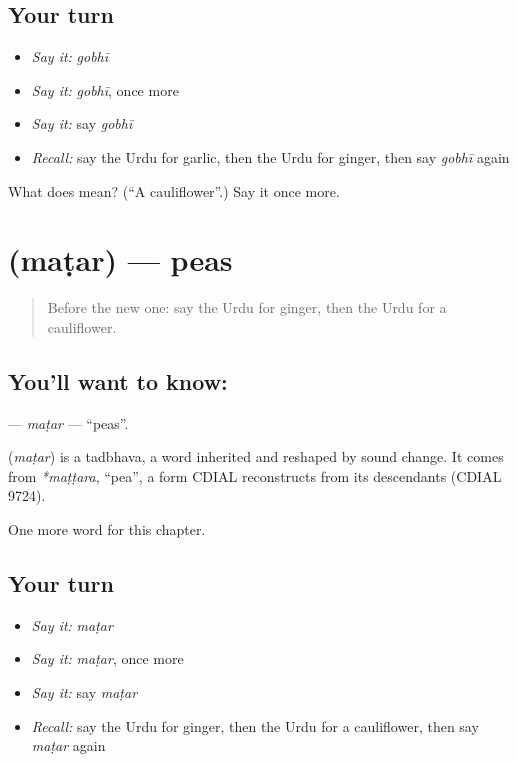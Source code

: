 \subsection*{Your turn}
\begin{itemize}
\raggedright
  \item \emph{Say it:} \emph{gobhī}
  \item \emph{Say it:} \emph{gobhī}, once more
  \item \emph{Say it:} say \emph{gobhī}
  \item \emph{Recall:} say the Urdu for garlic, then the Urdu for ginger, then say \emph{gobhī} again
\end{itemize}

\begin{tcolorbox}[breakable,colback=teal!4,colframe=teal!35!black,title={Before you move on}]
What does  mean? (\textquotedblleft{}A cauliflower\textquotedblright{}.) Say it once more.
\end{tcolorbox}
\section[\texorpdfstring{\ur{مٹر} (maṭar)}{مٹر (maṭar)}]{ (maṭar) — peas}

\label{lesson:UR-C115-matar}



\begin{quote}
Before the new one: say the Urdu for ginger, then the Urdu for a cauliflower.
\end{quote}

\subsection*{You'll want to know: }
\textbf{} — \emph{maṭar} — \textquotedblleft{}peas\textquotedblright{}.

\begin{cousinweb}
\textbf{} (\emph{maṭar}) is a tadbhava, a word inherited and reshaped by sound change. It comes from \emph{*maṭṭara}, \textquotedblleft{}pea\textquotedblright{}, a form CDIAL reconstructs from its descendants (CDIAL 9724).
\end{cousinweb}

\begin{grammarlens}[title={What you've built}]
One more word for this chapter.
\end{grammarlens}

\subsection*{Your turn}
\begin{itemize}
\raggedright
  \item \emph{Say it:} \emph{maṭar}
  \item \emph{Say it:} \emph{maṭar}, once more
  \item \emph{Say it:} say \emph{maṭar}
  \item \emph{Recall:} say the Urdu for ginger, then the Urdu for a cauliflower, then say \emph{maṭar} again
\end{itemize}

